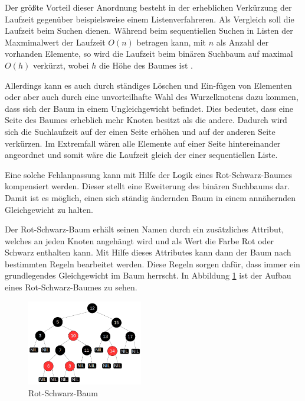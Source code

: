 Der größte Vorteil dieser Anordnung besteht in der erheblichen Verkürzung der Laufzeit gegenüber beispielsweise einem Listenverfahreren. 
Als Vergleich soll die Laufzeit beim Suchen dienen.
Während beim sequentiellen Suchen in Listen der Maxmimalwert der Laufzeit $O(n)$ betragen kann, mit $n$ als Anzahl der vorhanden Elemente, so wird die Laufzeit beim binären Suchbaum auf maximal $O(h)$ verkürzt, wobei $h$ die Höhe des Baumes ist \cite{tcormen}.

Allerdings kann es auch durch ständiges Löschen und Ein-fügen von Elementen oder aber auch durch eine unvorteilhafte Wahl des Wurzelknotens dazu kommen, dass sich der Baum in einem Ungleichgewicht befindet. Dies bedeutet, dass eine Seite des Baumes erheblich mehr Knoten besitzt als die andere. Dadurch wird sich die Suchlaufzeit auf der einen Seite erhöhen und auf der anderen Seite ver\-kürzen. Im Extremfall wären alle Elemente auf einer Seite hintereinander angeordnet und somit wäre die Laufzeit gleich der einer sequentiellen Liste.

Eine solche Fehlanpassung kann mit Hilfe der Logik eines Rot-Schwarz-Baumes kompensiert werden. Dieser stellt eine Eweiterung des binären Suchbaums dar. Damit ist es möglich, einen sich ständig ändernden Baum in einem annähernden Gleichgewicht zu halten. 

Der Rot-Schwarz-Baum erhält seinen Namen durch ein zusätzliches At\-tri\-but, welches an jeden Knoten an\-ge\-hängt wird und als Wert die Farbe Rot oder Schwarz enthalten kann. 
Mit Hilfe dieses Attributes kann dann der Baum nach bestimmten Regeln bearbeitet werden. Diese Regeln sorgen dafür, dass immer ein grundlegendes Gleichgewicht im Baum herrscht. 
In Abbildung \ref{fig:rbtree} ist der Aufbau eines Rot-Schwarz-Baumes zu sehen.

\begin{figure}[h]
	\centering
	\includegraphics[width=0.45\textwidth]{pictures/redblacktree.png}
	\caption{Rot-Schwarz-Baum}
	\label{fig:rbtree}
\end{figure}

